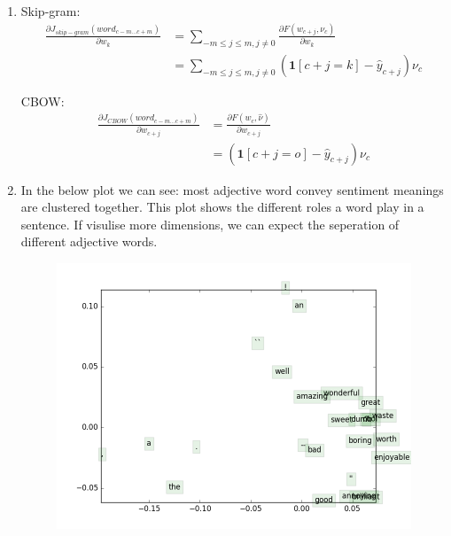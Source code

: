 \documentclass[10pt]{article}
\begin{document}
\begin{enumerate}[label=(\alph*)]
\item
Skip-gram:
\begin{equation*}
\begin{aligned}
	\frac{\partial J_{skip-gram}(word_{c-m...c+m})}{\partial w_{k}} & = \sum_{-m\le j\le m, j\neq0} \frac{\partial F(w_{c+j}, \nu_c)}{\partial w_{k}}\\
	& = \sum_{-m\le j\le m, j\neq0}(\mathbf{1}[c+j=k] - \hat{y}_{c+j})\nu_c
\end{aligned}
\end{equation*}

CBOW:
\begin{equation*}
\begin{aligned}
	\frac{\partial J_{CBOW}(word_{c-m...c+m})}{\partial w_{c+j}} & = \frac{\partial F(w_{c}, \hat{\nu})}{\partial w_{c+j}}\\
	& = (\mathbf{1}[c+j=o] - \hat{y}_{c+j})\nu_c
\end{aligned}
\end{equation*}

\item
In the below plot we can see: most adjective word convey sentiment meanings are clustered together.
This plot shows the different roles a word play in a sentence.
If visulise more dimensions, we can expect the seperation of different adjective words.
\begin{figure}[h]
\center
\includegraphics[scale=0.5]{q3_word_vectors.png}
\end{figure}

\end{enumerate}

\pagebreak[4]
\end{document}
